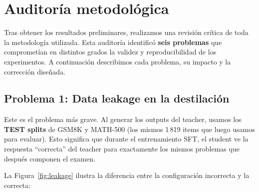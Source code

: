 \documentclass[11pt,a4paper]{article}
\begin{document}
\section{Auditor\'ia metodol\'ogica}
\label{sec:audit}

Tras obtener los resultados preliminares, realizamos una revisi\'on
cr\'itica de toda la metodolog\'ia utilizada. Esta auditor\'ia
identific\'o \textbf{seis problemas} que compromet\'ian en distintos
grados la validez y reproducibilidad de los experimentos. A
continuaci\'on describimos cada problema, su impacto y la correcci\'on
dise\~nada.

\subsection{Problema 1: Data leakage en la destilaci\'on}

Este es el problema m\'as grave. Al generar los outputs del teacher,
usamos los \textbf{TEST splits} de GSM8K y MATH-500 (los mismos 1\,819
items que luego usamos para evaluar). Esto significa que durante el
entrenamiento SFT, el student ve la respuesta ``correcta'' del teacher
para exactamente los mismos problemas que despu\'es componen el examen.

La Figura~\ref{fig:leakage} ilustra la diferencia entre la
configuraci\'on incorrecta y la correcta:
\end{document}
